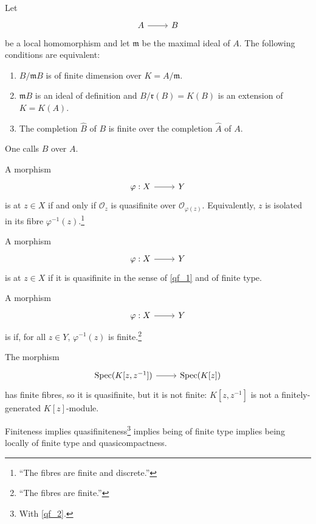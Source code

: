 \documentclass [11 pt, oneside] {article}
\begin{document}
\begin{proposition}\label{}\text{}
Let 
 \[
\begin{tikzcd}
A\ar[r]&B
\end{tikzcd}
\] 
be a local homomorphism and let $\mathfrak{m}$ be the maximal ideal of $A$. The following conditions are equivalent:
\begin{enumerate}
	\item $B/\mathfrak{m}B$ is of finite dimension over $K=A/\mathfrak{m}$.
	\item $\mathfrak{m}B$ is an ideal of definition and $B/\mathfrak{r}(B) = K(B)$ is an extension of $K=K(A)$.
	\item The completion $\widehat{B}$ of $B$ is finite over the completion $\widehat{A}$ of $A$.
\end{enumerate}
\end{proposition}

One calls $B$  over $A$.
\begin{definition}[SGA 1 I 2]\label{qf_1}\text{}
A morphism 
\[
\begin{tikzcd}
\varphi :X\ar[r]& Y
\end{tikzcd}
\]  
is  at $z\in X$ if and only if $\mathscr{O}_z$ is quasifinite over $\mathscr{O}_{\varphi (z)}$. Equivalently, $z$ is isolated in its fibre $\varphi^{-1}(z)$.\footnote{``The fibres are finite and discrete.''}
\end{definition}
\begin{definition}[EGA II 6.2]\label{qf_2}\text{} 
	A morphism 
	\[
\begin{tikzcd}
\varphi :X\ar[r]& Y
\end{tikzcd}
\]  
 is  at $z\in X$ if it is quasifinite in the sense of \cref{qf_1} and of finite type. 
\end{definition}
\begin{definition}[Hartshorne p. 91]\label{qf_3}\text{}
A morphism 
\[
\begin{tikzcd}
\varphi :X\ar[r]& Y
\end{tikzcd}
\]  
 is  if, for all $z\in Y$, $\varphi^{-1}(z)$ is finite.\footnote{``The fibres are finite.''}
\end{definition}
\begin{remark}\label{qfnf_1}
	The morphism
	\[
\begin{tikzcd}
\Spec (K[z,z^{-1}])\ar[r]& \Spec (K[z])
\end{tikzcd}
\]  
	 has finite fibres, so it is quasifinite, but it is not finite: $K[z,z^{-1}]$ is not a finitely-generated $K[z]$-module.
\end{remark}
\begin{remark}
	Finiteness implies quasifiniteness\footnote{With \cref{qf_2}.} implies being of finite type implies being locally of finite type and quasicompactness.
\end{remark}
\end{document}
